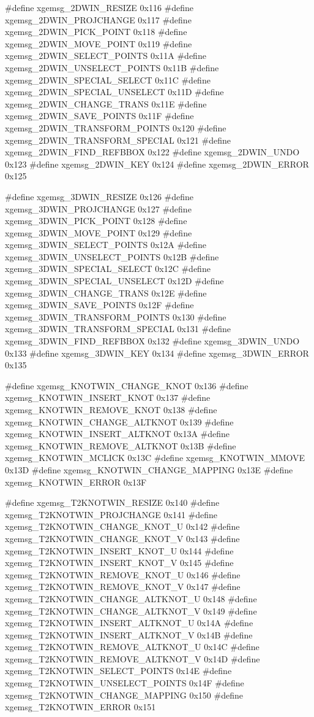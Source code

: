 \begin{listingC}
#define xgemsg_2DWIN_RESIZE                  0x116
#define xgemsg_2DWIN_PROJCHANGE              0x117
#define xgemsg_2DWIN_PICK_POINT              0x118
#define xgemsg_2DWIN_MOVE_POINT              0x119
#define xgemsg_2DWIN_SELECT_POINTS           0x11A
#define xgemsg_2DWIN_UNSELECT_POINTS         0x11B
#define xgemsg_2DWIN_SPECIAL_SELECT          0x11C
#define xgemsg_2DWIN_SPECIAL_UNSELECT        0x11D
#define xgemsg_2DWIN_CHANGE_TRANS            0x11E
#define xgemsg_2DWIN_SAVE_POINTS             0x11F
#define xgemsg_2DWIN_TRANSFORM_POINTS        0x120
#define xgemsg_2DWIN_TRANSFORM_SPECIAL       0x121
#define xgemsg_2DWIN_FIND_REFBBOX            0x122
#define xgemsg_2DWIN_UNDO                    0x123
#define xgemsg_2DWIN_KEY                     0x124
#define xgemsg_2DWIN_ERROR                   0x125

#define xgemsg_3DWIN_RESIZE                  0x126
#define xgemsg_3DWIN_PROJCHANGE              0x127
#define xgemsg_3DWIN_PICK_POINT              0x128
#define xgemsg_3DWIN_MOVE_POINT              0x129
#define xgemsg_3DWIN_SELECT_POINTS           0x12A
#define xgemsg_3DWIN_UNSELECT_POINTS         0x12B
#define xgemsg_3DWIN_SPECIAL_SELECT          0x12C
#define xgemsg_3DWIN_SPECIAL_UNSELECT        0x12D
#define xgemsg_3DWIN_CHANGE_TRANS            0x12E
#define xgemsg_3DWIN_SAVE_POINTS             0x12F
#define xgemsg_3DWIN_TRANSFORM_POINTS        0x130
#define xgemsg_3DWIN_TRANSFORM_SPECIAL       0x131
#define xgemsg_3DWIN_FIND_REFBBOX            0x132
#define xgemsg_3DWIN_UNDO                    0x133
#define xgemsg_3DWIN_KEY                     0x134
#define xgemsg_3DWIN_ERROR                   0x135

#define xgemsg_KNOTWIN_CHANGE_KNOT           0x136
#define xgemsg_KNOTWIN_INSERT_KNOT           0x137
#define xgemsg_KNOTWIN_REMOVE_KNOT           0x138
#define xgemsg_KNOTWIN_CHANGE_ALTKNOT        0x139
#define xgemsg_KNOTWIN_INSERT_ALTKNOT        0x13A
#define xgemsg_KNOTWIN_REMOVE_ALTKNOT        0x13B
#define xgemsg_KNOTWIN_MCLICK                0x13C
#define xgemsg_KNOTWIN_MMOVE                 0x13D
#define xgemsg_KNOTWIN_CHANGE_MAPPING        0x13E
#define xgemsg_KNOTWIN_ERROR                 0x13F

#define xgemsg_T2KNOTWIN_RESIZE              0x140
#define xgemsg_T2KNOTWIN_PROJCHANGE          0x141
#define xgemsg_T2KNOTWIN_CHANGE_KNOT_U       0x142
#define xgemsg_T2KNOTWIN_CHANGE_KNOT_V       0x143
#define xgemsg_T2KNOTWIN_INSERT_KNOT_U       0x144
#define xgemsg_T2KNOTWIN_INSERT_KNOT_V       0x145
#define xgemsg_T2KNOTWIN_REMOVE_KNOT_U       0x146
#define xgemsg_T2KNOTWIN_REMOVE_KNOT_V       0x147
#define xgemsg_T2KNOTWIN_CHANGE_ALTKNOT_U    0x148
#define xgemsg_T2KNOTWIN_CHANGE_ALTKNOT_V    0x149
#define xgemsg_T2KNOTWIN_INSERT_ALTKNOT_U    0x14A
#define xgemsg_T2KNOTWIN_INSERT_ALTKNOT_V    0x14B
#define xgemsg_T2KNOTWIN_REMOVE_ALTKNOT_U    0x14C
#define xgemsg_T2KNOTWIN_REMOVE_ALTKNOT_V    0x14D
#define xgemsg_T2KNOTWIN_SELECT_POINTS       0x14E
#define xgemsg_T2KNOTWIN_UNSELECT_POINTS     0x14F
#define xgemsg_T2KNOTWIN_CHANGE_MAPPING      0x150
#define xgemsg_T2KNOTWIN_ERROR               0x151


\end{listingC}
